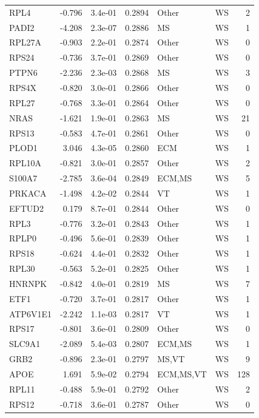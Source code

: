 \begin{table}[ht]
\begin{tabular}{lrlrllr}
  RPL4 & -0.796 & 3.4e-01 & 0.2894 & Other & WS & 2 \\ 
  PADI2 & -4.208 & 2.3e-07 & 0.2886 & MS & WS & 1 \\ 
  RPL27A & -0.903 & 2.2e-01 & 0.2874 & Other & WS & 0 \\ 
  RPS24 & -0.736 & 3.7e-01 & 0.2869 & Other & WS & 0 \\ 
  PTPN6 & -2.236 & 2.3e-03 & 0.2868 & MS & WS & 3 \\ 
  RPS4X & -0.820 & 3.0e-01 & 0.2866 & Other & WS & 0 \\ 
  RPL27 & -0.768 & 3.3e-01 & 0.2864 & Other & WS & 0 \\ 
  NRAS & -1.621 & 1.9e-01 & 0.2863 & MS & WS & 21 \\ 
  RPS13 & -0.583 & 4.7e-01 & 0.2861 & Other & WS & 0 \\ 
  PLOD1 & 3.046 & 4.3e-05 & 0.2860 & ECM & WS & 1 \\ 
  RPL10A & -0.821 & 3.0e-01 & 0.2857 & Other & WS & 2 \\ 
  S100A7 & -2.785 & 3.6e-04 & 0.2849 & ECM,MS & WS & 5 \\ 
  PRKACA & -1.498 & 4.2e-02 & 0.2844 & VT & WS & 1 \\ 
  EFTUD2 & 0.179 & 8.7e-01 & 0.2844 & Other & WS & 0 \\ 
  RPL3 & -0.776 & 3.2e-01 & 0.2843 & Other & WS & 1 \\ 
  RPLP0 & -0.496 & 5.6e-01 & 0.2839 & Other & WS & 1 \\ 
  RPS18 & -0.624 & 4.4e-01 & 0.2832 & Other & WS & 1 \\ 
  RPL30 & -0.563 & 5.2e-01 & 0.2825 & Other & WS & 1 \\ 
  HNRNPK & -0.842 & 4.0e-01 & 0.2819 & MS & WS & 7 \\ 
  ETF1 & -0.720 & 3.7e-01 & 0.2817 & Other & WS & 1 \\ 
  ATP6V1E1 & -2.242 & 1.1e-03 & 0.2817 & VT & WS & 1 \\ 
  RPS17 & -0.801 & 3.6e-01 & 0.2809 & Other & WS & 0 \\ 
  SLC9A1 & -2.089 & 5.4e-03 & 0.2807 & ECM,MS & WS & 1 \\ 
  GRB2 & -0.896 & 2.3e-01 & 0.2797 & MS,VT & WS & 9 \\ 
  APOE & 1.691 & 5.9e-02 & 0.2794 & ECM,MS,VT & WS & 128 \\ 
  RPL11 & -0.488 & 5.9e-01 & 0.2792 & Other & WS & 2 \\ 
  RPS12 & -0.718 & 3.6e-01 & 0.2787 & Other & WS & 0 \\ 

\end{tabular}
\end{table}
